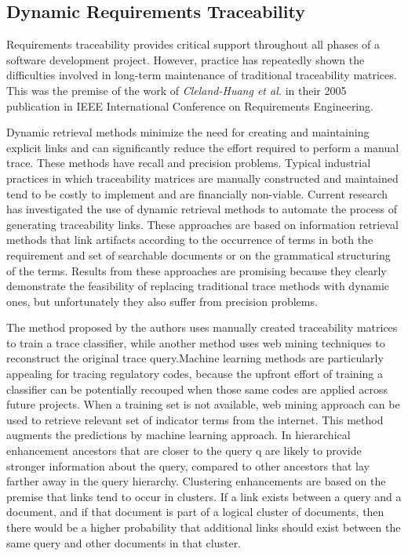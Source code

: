 \documentclass{report}
\begin{document}
\subsection{Dynamic Requirements Traceability}
\label{sec:dynamicReq}
Requirements traceability provides critical support
throughout all phases of a software development project.
However, practice has repeatedly shown the difficulties
involved in long-term maintenance of traditional
traceability matrices. This was the premise of the work of 
\textit{Cleland-Huang et al.} in their 
2005 publication in IEEE International Conference on Requirements
Engineering\cite{clelandHuang05}. 

Dynamic retrieval methods minimize the need for creating and maintaining explicit links and can
significantly reduce the effort required to perform a manual trace. These methods have recall and
precision problems. Typical industrial practices in which traceability matrices are manually
constructed and maintained tend to be costly to implement and are financially non-viable. Current
research has investigated the use of dynamic retrieval methods to automate the process of generating
traceability links. These approaches are based on information retrieval methods that link artifacts
according to the occurrence of terms in both the requirement and set of searchable documents or on the
grammatical structuring of the terms. Results from these approaches are promising because they clearly
demonstrate the feasibility of replacing traditional trace methods with dynamic ones, but
unfortunately they also suffer from precision problems. 

The method proposed by the authors uses manually created traceability matrices to train a trace
classifier, while another method uses web mining techniques to reconstruct the original trace
query.Machine learning methods are particularly appealing for tracing regulatory codes, because the
upfront effort of training a classifier can be potentially recouped when those same codes are applied
across future projects. When a training set is not available, web mining approach can be used to
retrieve relevant set of indicator terms from the internet. This method augments the predictions by
machine learning approach. In hierarchical enhancement ancestors that are closer to the query q are
likely to provide stronger information about the query, compared to other ancestors that lay farther
away in the query hierarchy. Clustering enhancements are based on the premise that links tend to occur
in clusters. If a link exists between a query and a document, and if that document is part of a
logical cluster of documents, then there would be a higher probability that additional links should
exist between the same query and other documents in that cluster.
\end{document}
